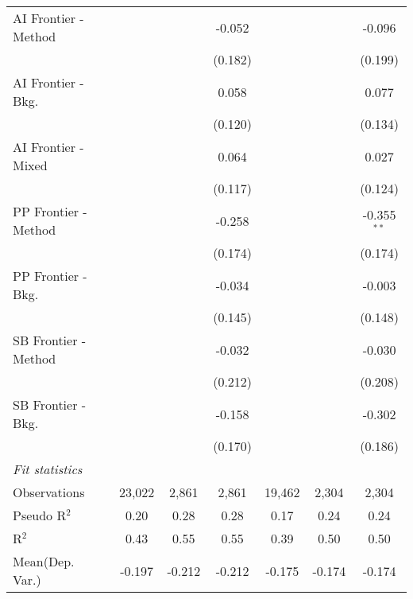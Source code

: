\begin{tabular}{lcccccc}
   AI Frontier - Method &               &         & -0.052  &               &         & -0.096\\   
                        &               &         & (0.182) &               &         & (0.199)\\   
   AI Frontier - Bkg.   &               &         & 0.058   &               &         & 0.077\\   
                        &               &         & (0.120) &               &         & (0.134)\\   
   AI Frontier - Mixed  &               &         & 0.064   &               &         & 0.027\\   
                        &               &         & (0.117) &               &         & (0.124)\\   
   PP Frontier - Method &               &         & -0.258  &               &         & -0.355$^{**}$\\   
                        &               &         & (0.174) &               &         & (0.174)\\   
   PP Frontier - Bkg.   &               &         & -0.034  &               &         & -0.003\\   
                        &               &         & (0.145) &               &         & (0.148)\\   
   SB Frontier - Method &               &         & -0.032  &               &         & -0.030\\   
                        &               &         & (0.212) &               &         & (0.208)\\   
   SB Frontier - Bkg.   &               &         & -0.158  &               &         & -0.302\\   
                        &               &         & (0.170) &               &         & (0.186)\\   
   \midrule
   \emph{Fit statistics}\\
   Observations         & 23,022        & 2,861   & 2,861   & 19,462        & 2,304   & 2,304\\  
   Pseudo R$^2$         & 0.20          & 0.28    & 0.28    & 0.17          & 0.24    & 0.24\\  
   R$^2$                & 0.43          & 0.55    & 0.55    & 0.39          & 0.50    & 0.50\\  
Mean(Dep. Var.) & -0.197 & -0.212 & -0.212 & -0.175 & -0.174 & -0.174 \\
   

\end{tabular}
